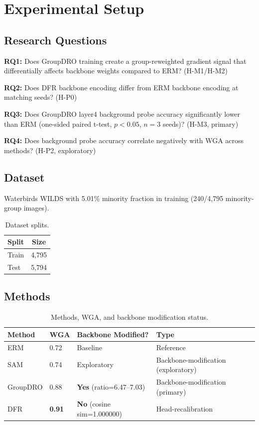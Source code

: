 \section{Experimental Setup}
\label{sec:experiments}

\subsection{Research Questions}

\textbf{RQ1:} Does GroupDRO training create a group-reweighted gradient signal that differentially affects backbone weights compared to ERM? (H-M1/H-M2)

\textbf{RQ2:} Does DFR backbone encoding differ from ERM backbone encoding at matching seeds? (H-P0)

\textbf{RQ3:} Does GroupDRO layer4 background probe accuracy significantly lower than ERM (one-sided paired t-test, $p < 0.05$, $n = 3$ seeds)? (H-M3, primary)

\textbf{RQ4:} Does background probe accuracy correlate negatively with WGA across methods? (H-P2, exploratory)

\subsection{Dataset}

Waterbirds WILDS \cite{sagawa2019distributionally,koh2021wilds} with 5.01\% minority fraction in training (240/4,795 minority-group images).

\begin{table}[h]
\centering
\caption{Dataset splits.}
\label{tab:dataset}
\begin{tabular}{@{}lc@{}}
\toprule
Split & Size \\
\midrule
Train & 4,795 \\
Test & 5,794 \\
\bottomrule
\end{tabular}
\end{table}

\subsection{Methods}

\begin{table}[h]
\centering
\caption{Methods, WGA, and backbone modification status.}
\label{tab:methods}
\begin{tabular}{@{}llll@{}}
\toprule
Method & WGA & Backbone Modified? & Type \\
\midrule
ERM & 0.72 & Baseline & Reference \\
SAM \cite{foret2021sharpness} & 0.74 & Exploratory & Backbone-modification (exploratory) \\
GroupDRO \cite{sagawa2019distributionally} & 0.88 & \textbf{Yes} (ratio=6.47--7.03) & Backbone-modification (primary) \\
DFR \cite{kirichenko2022last} & \textbf{0.91} & \textbf{No} (cosine sim=1.000000) & Head-recalibration \\
\bottomrule
\end{tabular}
\end{table}

